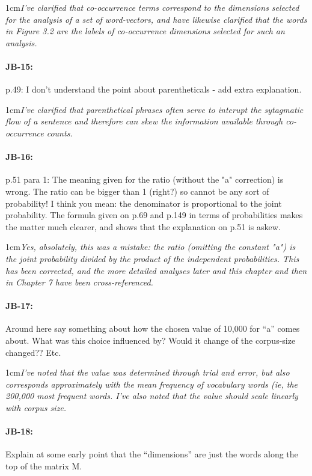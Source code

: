 \documentclass[11pt,a4paper]{article}
\newcommand{\res}[1]{\vspace{0.25cm} \begin{adjustwidth}{1cm}{}\emph{#1}\end{adjustwidth}}
\begin{document}
\res{I've clarified that co-occurrence terms correspond to the dimensions selected for the analysis of a set of word-vectors, and have likewise clarified that the words in Figure 3.2 are the labels of co-occurrence dimensions selected for such an analysis.}

\paragraph{JB-15:} p.49: I don't understand the point about parentheticals - add extra explanation.

\res{I've clarified that parenthetical phrases often serve to interupt the sytagmatic flow of a sentence and therefore can skew the information available through co-occurrence counts.}

\paragraph{JB-16:} p.51 para 1: The meaning given for the ratio (without the "a" correction) is wrong. The ratio can be bigger than 1 (right?) so cannot be any sort of probability! I think you mean: the denominator is proportional to the joint probability. The formula given on p.69 and p.149 in terms of probabilities makes the matter much clearer, and shows that the explanation on p.51 is askew.

\res{Yes, absolutely, this was a mistake: the ratio (omitting the constant "a") is the joint probability divided by the product of the independent probabilities.  This has been corrected, and the more detailed analyses later and this chapter and then in Chapter 7 have been cross-referenced.}

\paragraph{JB-17:} Around here say something about how the chosen value of 10,000 for ``a'' comes about. What was this choice influenced by? Would it change of the corpus-size changed?? Etc.

\res{I've noted that the value was determined through trial and error, but also corresponds approximately with the mean frequency of vocabulary words (ie, the 200,000 most frequent words.  I've also noted that the value should scale linearly with corpus size.}

\paragraph{JB-18:} Explain at some early point that the ``dimensions'' are just the words along the top of the matrix M.
\end{document}
